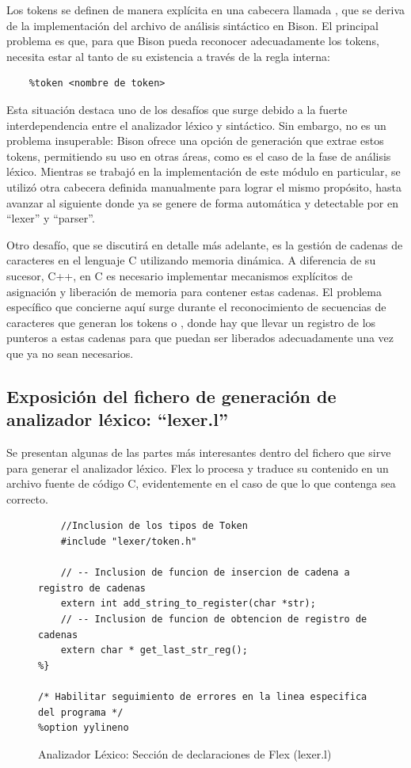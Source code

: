 Los tokens se definen de manera explícita en una cabecera llamada , que se deriva de la implementación del archivo de análisis sintáctico en Bison. El principal problema es que, para que Bison pueda reconocer adecuadamente los tokens, necesita estar al tanto de su existencia a través de la regla interna:
\begin{verbatim}
    %token <nombre de token>
\end{verbatim}

Esta situación destaca uno de los desafíos que surge debido a la fuerte interdependencia entre el analizador léxico y sintáctico. Sin embargo, no es un problema insuperable: Bison ofrece una opción de generación que extrae estos tokens, permitiendo su uso en otras áreas, como es el caso de la fase de análisis léxico. Mientras se trabajó en la implementación de este módulo en particular, se utilizó otra cabecera definida manualmente para lograr el mismo propósito, hasta avanzar al siguiente donde ya se genere de forma automática y detectable por en ``lexer'' y ``parser''.

\vspace{0.5cm}

Otro desafío, que se discutirá en detalle más adelante, es la gestión de cadenas de caracteres en el lenguaje C utilizando memoria dinámica. A diferencia de su sucesor, C++, en C es necesario implementar mecanismos explícitos de asignación y liberación de memoria para contener estas cadenas. El problema específico que concierne aquí surge durante el reconocimiento de secuencias de caracteres que generan los tokens  o , donde hay que llevar un registro de los punteros a estas cadenas para que puedan ser liberados adecuadamente una vez que ya no sean necesarios.

\subsection{Exposición del fichero de generación de analizador léxico: ``lexer.l''}
Se presentan algunas de las partes más interesantes dentro del fichero que sirve para generar el analizador léxico. Flex lo procesa y traduce su contenido en un archivo fuente de código C, evidentemente en el caso de que lo que contenga sea correcto.

\newpage

\begin{figure}[ht]
\begin{lstlisting}[style=customflex]
%{
    //Inclusion de los tipos de Token
    #include "lexer/token.h"

    // -- Inclusion de funcion de insercion de cadena a registro de cadenas
    extern int add_string_to_register(char *str);
    // -- Inclusion de funcion de obtencion de registro de cadenas
    extern char * get_last_str_reg();
%}

/* Habilitar seguimiento de errores en la linea especifica del programa */
%option yylineno
\end{lstlisting}
\caption{Analizador Léxico: Sección de declaraciones de Flex (lexer.l)}
\label{fig:flexdeclarations}
\end{figure}

